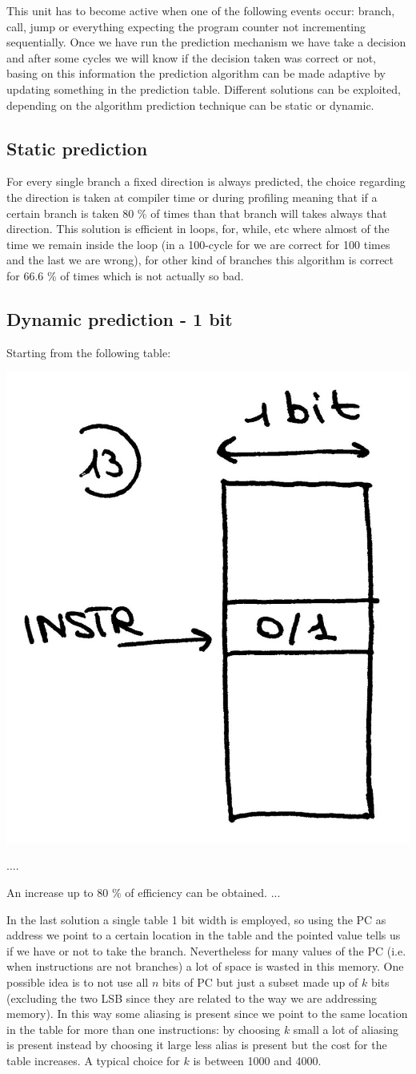 This unit has to become active when one of the following events occur: branch, call, jump or everything expecting the program counter not incrementing sequentially.
Once we have run the prediction mechanism we have take a decision and after some cycles we will know if the decision taken was correct or not, basing on this information the prediction algorithm can be made adaptive by updating something in the prediction table. Different solutions can be exploited, depending on the algorithm prediction technique can be static or dynamic.

\subsection{Static prediction}

For every single branch a fixed direction is always predicted, the choice regarding the direction is taken at compiler time or during profiling meaning that if a certain branch is taken 80 \% of times than that branch will takes always that direction. This solution is efficient in loops, for, while, etc where almost of the time we remain inside the loop (in a 100-cycle for we are correct for 100 times and the last we are wrong), for other kind of branches this algorithm is correct for 66.6 \% of times which is not actually so bad.

\subsection{Dynamic prediction - 1 bit}
Starting from the following table:

\begin{center}
  \includegraphics[width=0.3\linewidth]{img/img3/13}
\end{center}
....

An increase up to 80 \% of efficiency can be obtained.
...

In the last solution a single table 1 bit width is employed, so using the PC as address we point to a certain location in the table and the pointed value tells us if we have or not to take the branch. Nevertheless for many values of the PC (i.e. when instructions are not branches) a lot of space is wasted in this memory. One possible idea is to not use all $n$ bits of PC but just a subset made up of $k$ bits (excluding the two LSB since they are related to the way we are addressing memory). In this way some aliasing is present since we point to the same location in the table for more than one instructions: by choosing $k$ small a lot of aliasing is present instead by choosing it large less alias is present but the cost for the table increases. A typical choice for $k$ is between 1000 and 4000.

